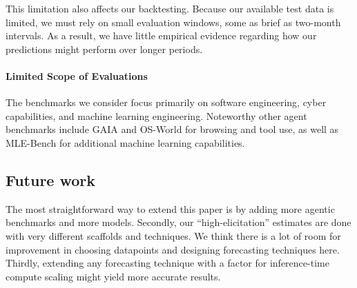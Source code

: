 This limitation also affects our backtesting. Because our available test data is limited, we must rely on small evaluation windows, some as brief as two-month intervals. As a result, we have little empirical evidence regarding how our predictions might perform over longer periods.

\paragraph{Limited Scope of Evaluations}
The benchmarks we consider focus primarily on software engineering, cyber capabilities, and machine learning engineering. 
Noteworthy other agent benchmarks include GAIA \citep{mialon2023gaiabenchmarkgeneralai} and OS-World \citep{xie2024osworldbenchmarkingmultimodalagents} for browsing and tool use, as well as MLE-Bench \citep{chan2024mlebenchevaluatingmachinelearning} for additional machine learning capabilities.

%
%
\subsection{Future work}
The most straightforward way to extend this paper is by adding more agentic benchmarks and more models. 
Secondly, our ``high-elicitation'' estimates are done with very different scaffolds and techniques. We think there is a lot of room for improvement in choosing datapoints and designing forecasting techniques here. 
Thirdly, extending any forecasting technique with a factor for inference-time compute scaling might yield more accurate results. 
